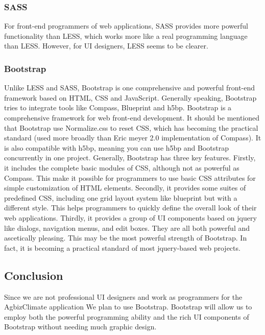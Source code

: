 \documentclass[letterpaper,10pt]{article}
\begin{document}
		\subsubsection{SASS}
        For front-end programmers of web applications, SASS provides more powerful functionality than LESS, which works more like a real programming language than LESS. However, for UI designers, LESS seems to be clearer.

		\subsubsection{Bootstrap}
    Unlike LESS and SASS, Bootstrap is one comprehensive and powerful front-end framework based on HTML, CSS and JavaScript. Generally speaking, Bootstrap tries to integrate tools like Compass, Blueprint and h5bp. Bootstrap is a comprehensive framework for web front-end development. It should be mentioned that Bootstrap use Normalize.css to reset CSS, which has becoming the practical standard (used more broadly than Eric meyer 2.0 implementation of Compass). It is also compatible with h5bp, meaning you can use h5bp and Bootstrap concurrently in one project. Generally, Bootstrap has three key features. Firstly, it includes the complete basic modules of CSS, although not as powerful as Compass. This make it possible for programmers to use basic CSS attributes for simple customization of HTML elements. Secondly, it provides some suites of predefined CSS, including one grid layout system like blueprint but with a different style. This helps programmers to quickly define the overall look of their web applications. Thirdly, it provides a group of UI components based on jquery like dialogs, navigation menus, and edit boxes. They are all both powerful and ascetically pleasing. This may be the most powerful strength of Bootstrap. In fact, it is becoming a practical standard of most jquery-based web projects.

	\subsection{Conclusion}
      Since we are not professional UI designers and work as programmers for the AgbizClimate application We plan to use Bootstrap. Bootstrap will allow us to employ both the powerful programming ability and the rich UI components of Bootstrap without needing much graphic design.
\end{document}
